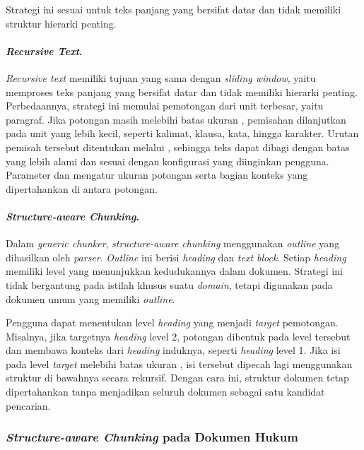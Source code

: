 Strategi ini sesuai untuk teks panjang yang bersifat datar dan tidak memiliki struktur hierarki penting.

\paragraph{\emph{Recursive Text}.}
\label{par:recursive-text}

\emph{Recursive text} memiliki tujuan yang sama dengan \emph{sliding window}, yaitu memproses teks panjang yang bersifat datar dan tidak memiliki hierarki penting. Perbedaannya, strategi ini memulai pemotongan dari unit terbesar, yaitu paragraf. Jika potongan masih melebihi batas ukuran , pemisahan dilanjutkan pada unit yang lebih kecil, seperti kalimat, klausa, kata, hingga karakter. Urutan pemisah tersebut ditentukan melalui , sehingga teks dapat dibagi dengan batas yang lebih alami dan sesuai dengan konfigurasi yang diinginkan pengguna. Parameter  dan  mengatur ukuran potongan serta bagian konteks yang dipertahankan di antara potongan.

\paragraph{\emph{Structure-aware Chunking}.}
\label{par:structure-aware-chunking}

Dalam \emph{generic chunker}, \emph{structure-aware chunking} menggunakan \emph{outline} yang dihasilkan oleh \emph{parser}. \emph{Outline} ini berisi \emph{heading} dan \emph{text block}. Setiap \emph{heading} memiliki level yang menunjukkan kedudukannya dalam dokumen. Strategi ini tidak bergantung pada istilah khusus suatu \emph{domain}, tetapi digunakan pada dokumen umum yang memiliki \emph{outline}.

Pengguna dapat menentukan level \emph{heading} yang menjadi \emph{target} pemotongan. Misalnya, jika targetnya \emph{heading} level 2, potongan dibentuk pada level tersebut dan membawa konteks dari \emph{heading} induknya, seperti \emph{heading} level 1. Jika isi pada level \emph{target} melebihi batas ukuran \mbox{}, isi tersebut dipecah lagi menggunakan struktur di bawahnya secara rekursif. Dengan cara ini, struktur dokumen tetap dipertahankan tanpa menjadikan seluruh dokumen sebagai satu kandidat pencarian.

\subsubsection{\emph{Structure-aware Chunking} pada Dokumen Hukum}
\label{subsubsec:legal-structure-aware}

